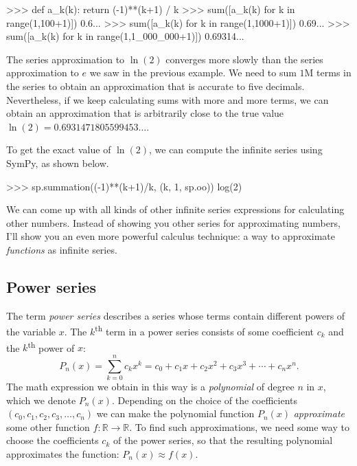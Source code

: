 				\begin{codeblock}[]
				>>> def a_k(k):
				        return (-1)**(k+1) / k
				>>> sum([a_k(k) for k in range(1,100+1)])
				0.6...
				>>> sum([a_k(k) for k in range(1,1000+1)])
				0.69...
				>>> sum([a_k(k) for k in range(1,1_000_000+1)])
				0.69314...
				\end{codeblock}
	
				\noindent
				The series approximation to $\ln(2)$ converges more slowly
				than the series approximation to $e$ we saw in the previous example.
				We need to sum $1$M terms in the series to obtain
				an approximation that is accurate to five decimals.
				Nevertheless,
				if we keep calculating sums with more and more terms,
				we can obtain an approximation that is arbitrarily close
				to the true value $\ln(2) = 0.6931471805599453\ldots$.
	
				To get the exact value of $\ln(2)$,
				we can compute the infinite series using SymPy,
				as shown below.
	
				\begin{codeblock}[]
				>>> sp.summation((-1)**(k+1)/k, (k, 1, sp.oo))
				log(2)
				\end{codeblock}
	
			\noindent
			We can come up with all kinds of other infinite series expressions
			for calculating other numbers.
			Instead of showing you other series for approximating numbers,
			I'll show you an even more powerful calculus technique:
			a way to approximate \emph{functions} as infinite series.



	\subsection{Power series}
	\label{series:power_series}

		The term \emph{power series} describes a series
		whose terms contain different powers of the variable $x$.
		The $k$\textsuperscript{th} term in a power series
		consists of some coefficient $c_k$
		and the $k$\textsuperscript{th} power of $x$:
		\[
			P_n(x)
				= \sum_{k=0}^n c_k x^k
				= c_0 + c_1x + c_2x^2 + c_3x^3 %
					+ \cdots + c_nx^n.
		\]
		The math expression we obtain in this way is a \emph{polynomial} of degree $n$ in $x$,
		which we denote $P_n(x)$.
		Depending on the choice of the coefficients $(c_0, c_1, c_2, c_3, \ldots, c_n)$
		we can make the polynomial function $P_n(x)$
		\emph{approximate} some other function $f : \mathbb{R} \to \mathbb{R}$.
		To find such approximations,
		we need some way to choose the coefficients $c_k$ of the power series,
		so that the resulting polynomial approximates the function:
		$P_n(x) \approx f(x)$.


